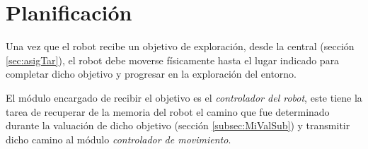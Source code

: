 






\section{Planificación}\label{sec:miNav}


Una vez que el robot recibe un objetivo de exploración, desde la central
(sección \ref{sec:asigTar}), el robot debe moverse físicamente hasta el lugar
indicado para completar dicho objetivo y progresar en la exploración del entorno.

El módulo encargado de recibir el objetivo es el \emph{controlador del robot},
este tiene la tarea de recuperar de la memoria del robot el camino que fue
determinado durante la valuación de dicho objetivo (sección
\ref{subsec:MiValSub}) y transmitir dicho camino al módulo \emph{controlador de
movimiento}. 

